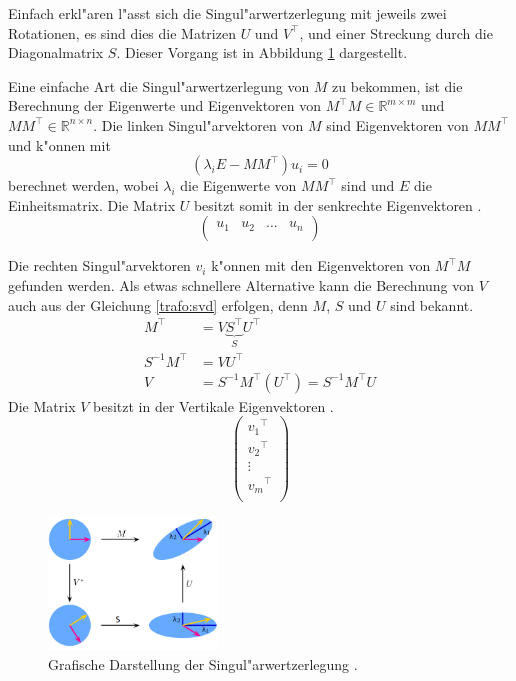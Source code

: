 \begin{refsection}
Einfach erkl"aren l"asst sich die Singul"arwertzerlegung mit jeweils zwei Rotationen, es sind dies die Matrizen $U$ und $V^\top$, und einer Streckung durch die Diagonalmatrix $S$. Dieser Vorgang ist in Abbildung \ref{trafo:SVDFig} dargestellt. 

Eine einfache Art die Singul"arwertzerlegung von $M$ zu bekommen, ist die Berechnung der Eigenwerte und Eigenvektoren von $M^\top M \in \mathbb{R}^{m \times m}$ und $MM^\top \in \mathbb{R}^{n \times n}$. Die linken Singul"arvektoren von $M$ sind Eigenvektoren von $MM^\top$ und k"onnen mit
\begin{equation*}
	\left(\lambda_i E - MM^\top\right)u_i = 0
\end{equation*}
berechnet werden, wobei $\lambda_i$ die Eigenwerte von $MM^\top$ sind und $E$ die Einheitsmatrix. Die Matrix $U$ besitzt somit in der senkrechte Eigenvektoren \cite{trafo:Watkins}.
\begin{equation*}
	\left( 
		\begin{array}{cccc}
		u_1 & u_2 & \dots & u_n  \\		
		\end{array}
	\right)
\end{equation*}

Die rechten Singul"arvektoren $v_i$ k"onnen mit den Eigenvektoren von $M^\top M$ gefunden werden. Als etwas schnellere Alternative kann die Berechnung von $V$ auch aus der Gleichung \ref{trafo:svd} erfolgen, denn $M$, $S$ und $U$ sind bekannt. 
\begin{align*}
	M^\top &= V \underbrace{S^\top}_{S} U^\top\\
	S^{-1} M^\top &= V U^\top\\
	V &= S^{-1} M^\top \left(U^\top\right) = S^{-1} M^\top U
\end{align*}
Die Matrix $V$ besitzt in der Vertikale Eigenvektoren  \cite{trafo:Watkins}.
\begin{equation*}
	\left( 
		\begin{array}{c}
		{v_1}^{\top}\\
		{v_2}^{\top}\\
		\vdots\\
		{v_m}^{\top}\\			
		\end{array}
	\right)
\end{equation*}

\begin{figure}
	\centering
	\includegraphics[width=0.4\textwidth]{./trafo/images/svd.png}
	\caption{Grafische Darstellung der Singul"arwertzerlegung \cite{trafo:SVDWiki}.}
	\label{trafo:SVDFig}
\end{figure}


\end{refsection}
